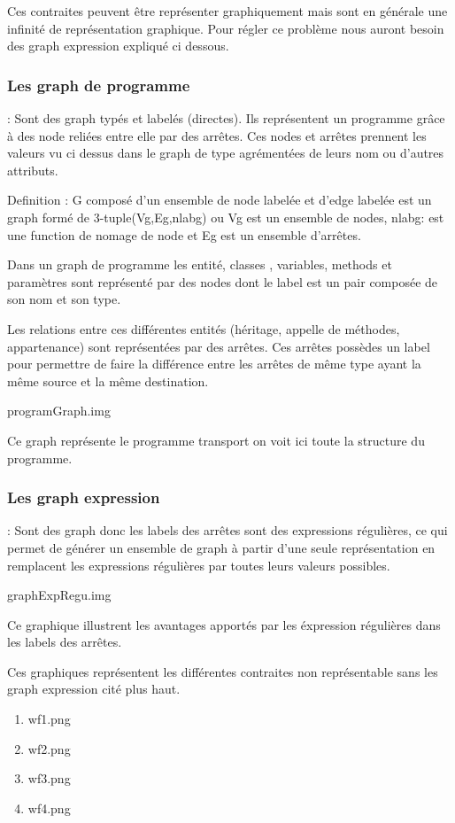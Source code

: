 \documentclass[a4paper, 10pt]{article}
\begin{document}
Ces contraites peuvent être représenter graphiquement mais sont en générale une infinité de représentation graphique.
Pour régler ce problème nous auront besoin des graph expression expliqué ci dessous.

\subsubsection{Les graph de programme} : Sont des graph typés et labelés (directes). Ils représentent un programme grâce à des node reliées entre elle par des arrêtes. Ces nodes et arrêtes prennent les valeurs vu ci dessus dans le graph de type agrémentées de leurs nom ou d'autres attributs.

Definition : G composé d'un ensemble de node labelée et d'edge labelée est un graph formé de 3-tuple(Vg,Eg,nlabg) ou Vg est un ensemble de nodes, nlabg: est une function de nomage de node et Eg est un ensemble
d'arrêtes.

Dans un graph de programme les entité, classes , variables, methods et paramètres sont représenté par des nodes dont le label est un pair composée de son nom et son type.

Les relations entre ces différentes entités (héritage, appelle de méthodes, appartenance) sont représentées par des arrêtes. 
Ces arrêtes possèdes un label pour permettre de faire la différence entre les arrêtes de même type ayant la même source et la même destination.

programGraph.img

Ce graph représente le programme transport on voit ici toute la structure du programme.

\subsubsection{Les graph expression} : Sont des graph donc les labels des arrêtes sont des expressions régulières, ce qui permet de générer un ensemble de graph à partir d'une seule représentation en remplacent les expressions régulières par toutes leurs valeurs possibles.

graphExpRegu.img

Ce graphique illustrent les avantages apportés par les éxpression régulières dans les labels des arrêtes.

Ces graphiques représentent les différentes contraites non représentable sans les graph expression cité plus haut.

\begin{enumerate}
\item wf1.png
\item wf2.png
\item wf3.png
\item wf4.png
\end{enumerate}
\end{document}

